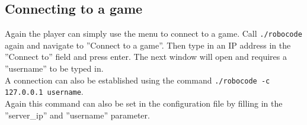 \documentclass[12pt]{report}
\begin{document}
\subsection{Connecting to a game}
Again the player can simply use the menu to connect to a game. Call \lstinline{./robocode} again and navigate to ''Connect to a game''. Then type in an IP address in the ''Connect to'' field and press enter. The next window will open and requires a ''username'' to be typed in. \\

A connection can also be established using the command \lstinline{./robocode -c 127.0.0.1 username}. \\

Again this command can also be set in the configuration file by filling in the ''server\_ip'' and ''username'' parameter.
\end{document}
